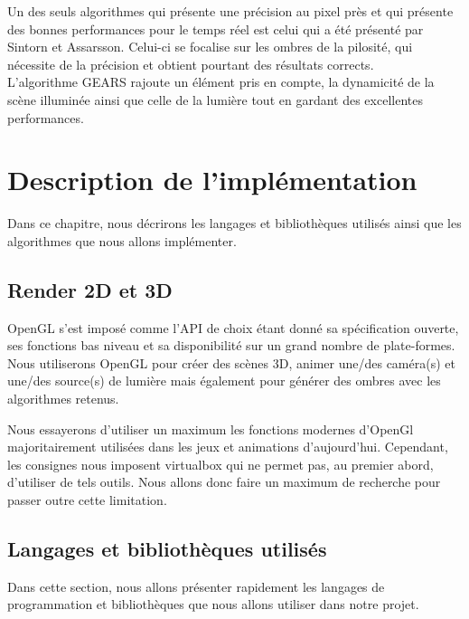 \documentclass[a4paper,10pt]{report}
\begin{document}
Un des seuls algorithmes qui présente une précision au pixel près et qui présente des bonnes performances pour le temps réel est celui qui a été présenté par Sintorn et Assarsson\cite{sintorn2009hair}. Celui-ci se focalise sur les ombres de la pilosité, qui nécessite de la précision et obtient pourtant des résultats corrects.
\\

L'algorithme GEARS\cite{wang2014gears} rajoute un élément pris en compte, la dynamicité de la scène illuminée ainsi que celle de la lumière tout en gardant des excellentes performances.


\chapter{Description de l’implémentation}

Dans ce chapitre, nous décrirons les langages et bibliothèques utilisés ainsi que les algorithmes que nous allons implémenter.

\section{Render 2D et 3D}
OpenGL s'est imposé comme l'API de choix étant donné sa spécification ouverte, ses fonctions bas niveau et sa disponibilité sur un grand nombre de plate-formes.
Nous utiliserons OpenGL pour créer des scènes 3D, animer une/des caméra(s) et une/des source(s) de lumière mais également pour générer des ombres avec les algorithmes retenus.

Nous essayerons d'utiliser un maximum les fonctions modernes d'OpenGl majoritairement utilisées dans les jeux et animations d'aujourd'hui. Cependant, les consignes nous imposent virtualbox qui ne permet pas, au premier abord, d'utiliser de tels outils. Nous allons donc faire un maximum de recherche pour passer outre cette limitation.

\section{Langages et bibliothèques utilisés}

Dans cette section, nous allons présenter rapidement les langages de programmation et bibliothèques que nous allons utiliser dans notre projet.
\end{document}
